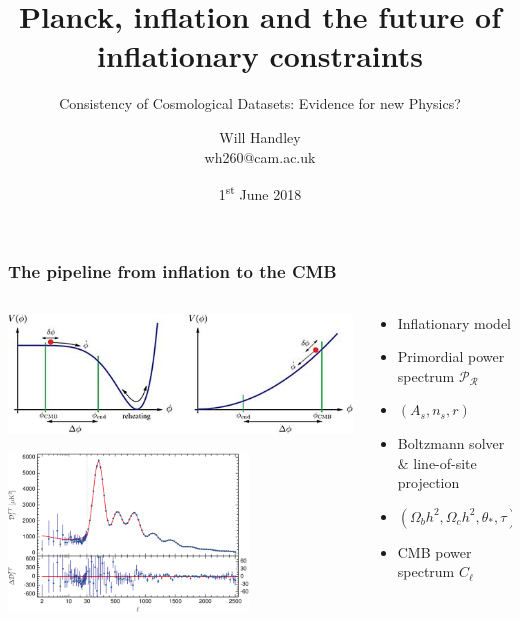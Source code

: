 \documentclass[%
]{beamer}
\title{Planck, inflation and the future of inflationary constraints}
\subtitle{Consistency of Cosmological Datasets: Evidence for new Physics?}
\author[Handley] %
{Will Handley\\ \small{wh260@cam.ac.uk}}
\institute[University of Cambridge] %
{%
    Astrophysics Group \\
    Cavendish Laboratory \\
    University of Cambridge
}
\date{1\textsuperscript{st} June 2018}
\begin{document}
\begin{frame}
    \titlepage{}
\end{frame}

\begin{frame}
    \frametitle{The pipeline from inflation to the CMB}
    \begin{columns}
        \begin{column}{0.5\textwidth}
            \centering
            \includegraphics[width=\textwidth]{./figures/p2001dcd6g16001.jpg}
            \begin{minipage}{0.7\textwidth}
                
            \end{minipage}
            \includegraphics[width=0.7\textwidth]{./figures/700px-A15_TT.png}
        \end{column}
        \hfill
        \begin{column}{0.5\textwidth}
            \begin{itemize}
                \item Inflationary model
                \item Primordial power spectrum $\mathcal{P}_\mathcal{R}$
                \item $(A_s,n_s,r)$
                \item Boltzmann solver \& line-of-site projection
                \item $(\Omega_b h^2,\Omega_c h^2,\theta_\ast,\tau)$
                \item CMB power spectrum $C_\ell$
            \end{itemize}
        \end{column}
    \end{columns}

\end{frame}
\end{document}
